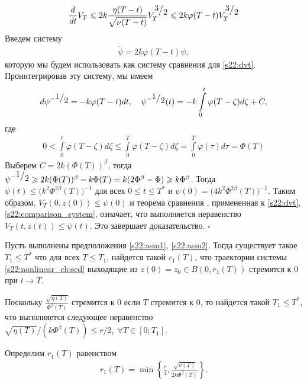 \documentclass[../main.tex]{subfiles}
\begin{document}
\begin{gather}\label{s22:dvt}
 \frac{d}{dt}V_T \leqslant 2 k \frac{\eta(T-t)}{\sqrt{\nu(T-t)}}V_T^{\frc{3}{2}} \leqslant 2k \varphi(T-t) V_T^{\frc{3}{2}}
\end{gather}
Введем систему
\begin{gather}\label{s22:comparison_system}
 \dot{\psi} = 2k \varphi(T-t) \psi,
\end{gather}
которую мы будем использовать как систему сравнения для \eqref{s22:dvt}. 
Проинтегрировав эту систему, мы имеем
\begin{gather*}
 d\psi^{-\frc{1}{2}} = -k \varphi(T-t) dt, \quad
 \psi^{-\frc{1}{2}}(t) = -k \int\limits_0^t \varphi(T-\zeta) d\zeta + C,
\end{gather*}
где
\begin{gather*}
 0 < \int\limits_0^t \varphi(T-\zeta) d\zeta \leqslant \int\limits_0^T \varphi(T-\zeta) d\zeta = 
 \int\limits_0^T \varphi(\tau) d\tau = \Phi(T) 
\end{gather*}
Выберем $C = 2k (\Phi(T))^{\beta}$, тогда $\psi^{-\frc{1}{2}} \geqslant 2k (\Phi(T))^{\beta} - k \Phi(T) = k (2\Phi^\beta - \Phi)\geqslant k\Phi^\beta $.
Тогда $\psi(t) \leqslant \big(k^2\Phi^{2\beta}(T)\big)^{-1}$ для всех $ 0 \leqslant t \leqslant T^* $ и $\psi(0) = \big(4k^2\Phi^{2\beta}(T)\big)^{-1} $.
Таким образом, $V_T(0,z(0))\leqslant \psi(0)$ и теорема сравнения \cite{walter}, примененная к \eqref{s22:dvt}, \eqref{s22:comparison_system}, означает, что выполняется неравенство $V_T(t,z(t))\leqslant \psi(t)$. 
Это завершает доказательство.
 \hfill $ \square $

\begin{theorem}\label{s22:th:tends_to_zero}
 Пусть выполнены предположения \ref{s22:asm1}, \ref{s22:asm2}. 
Тогда существует такое $ T_1 \leqslant T^*$ что для всех $ T \leqslant T_1$, найдется такой $ r_1(T)$, что траектории системы \eqref{s22:nonlinear_closed} выходящие из $z(0) = z_0 \in B(0,r_1(T))$ стремятся к $0$ при $t \to T$.
\end{theorem}

\doc 
Поскольку $\frac{\sqrt{\eta(T)}}{\Phi^\beta(T)} $ стремится к $0$ если $T$ стремится к $0$, то найдется такой $ T_1 \leqslant T^*$, что выполняется следующее неравенство
$ \sqrt{\eta(T)}/(k\Phi^\beta(T)) \leqslant r/{2}, \; \forall T \in [0;T_1]$.

Определим $r_1(T)$ равенством
\begin{gather}\label{s22:r1}
 r_1(T) = \min \left\{ \frac{r}{4}, \frac{\sqrt{\nu(T)}}{2k\Phi^\beta(T)} \right\}.
\end{gather}
\end{document}
